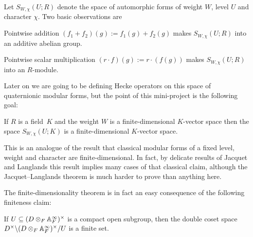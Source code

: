 Let $S_{W,\chi}(U;R)$ denote the space of automorphic forms of weight $W$, level $U$ and character
$\chi$. Two basic observations are

\begin{definition}
  \label{TotallyDefiniteQuaternionAlgebra.AutomorphicForm.addCommGroup}
  \leanok
  Pointwise addition $(f_1+f_2)(g):=f_1(g)+f_2(g)$ makes $S_{W,\chi}(U;R)$ into an additive
  abelian group.
\end{definition}

\begin{definition}
  \label{TotallyDefiniteQuaternionAlgebra.AutomorphicForm.module}
  \leanok
  Pointwise scalar multiplication $(r\cdot f)(g):= r\cdot(f(g))$ makes
  $S_{W,\chi}(U;R)$ into an $R$-module.
\end{definition}

  Later on we are going to be defining Hecke operators on this space of quaternionic modular
  forms, but the point of this mini-project is the following goal:

\begin{theorem}
  \label{TotallyDefiniteQuaternionAlgebra.AutomorphicForm.finiteDimensional}
  If $R$ is a field~$K$ and the weight $W$ is a finite-dimensional $K$-vector space
  then the space $S_{W,\chi}(U;K)$ is a finite-dimensional $K$-vector space.
\end{theorem}

This is an analogue of the result that classical modular forms of a fixed
level, weight and character are finite-dimensional. In fact, by delicate results
of Jacquet and Langlands this result implies many cases of that classical claim,
although the Jacquet--Langlands theorem is much harder to prove than anything
here.

The finite-dimensionality theorem is in fact an easy consequence of the following finiteness claim:
\begin{theorem}
  \label{TotallyDefiniteQuaternionAlgebra.finiteDoubleCoset}
  If $U\subseteq (D\otimes_F\mathbb{A}_F^\infty)^\times$ is a compact open subgroup,
  then the double coset space $D^\times\backslash(D\otimes_F\mathbb{A}_F^\infty)^\times/U$ is a
  finite set.
\end{theorem}

